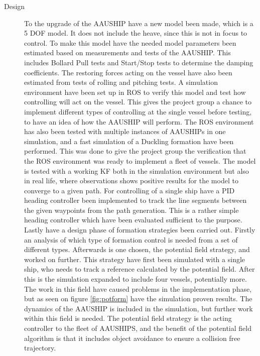 \begin{description}
\item[Design] To the upgrade of the AAUSHIP have a new model been made, which is a 5 \ac{DOF} model. It does not include the heave, since this is not in focus to control. To make this model have the needed model parameters been estimated based on measurements and tests of the AAUSHIP. This includes Bollard Pull tests and Start/Stop tests to determine the damping coefficients. The restoring forces acting on the vessel have also been estimated from tests of rolling and pitching tests. A simulation environment have been set up in \ac{ROS} to verify this model and test how controlling will act on the vessel. This gives the project group a chance to implement different types of controlling at the single vessel before testing, to have an idea of how the AAUSHIP will perform. The \ac{ROS} environment has also been tested with multiple instances of AAUSHIPs in one simulation, and a fast simulation of a Duckling formation have been performed. This was done to give the project group the verification that the \ac{ROS} environment was ready to implement a fleet of vessels. The model is tested with a working \ac{KF} both in the simulation environment but also in real life, where observations shows positive results for the model to converge to a given path. For controlling of a single ship have a PID heading controller been implemented to track the line segments between the given waypoints from the path generation. This is a rather simple heading controller which have been evaluated sufficient to the purpose. Lastly have a design phase of formation strategies been carried out. Firstly an analysis of which type of formation control is needed from a set of different types. Afterwards is one chosen, the potential field strategy, and worked on further. This strategy have first been simulated with a single ship, who needs to track a reference calculated by the potential field. After this is the simulation expanded to include four vessels, potentially more. The work in this field have caused problems in the implementation phase, but as seen on figure \ref{fig:potform} have the simulation proven results. The dynamics of the AAUSHIP is included in the simulation, but further work within this field is needed. The potential field strategy is the acting controller to the fleet of AAUSHIPS, and the benefit of the potential field algorithm is that it includes object avoidance to ensure a collision free trajectory.
\end{description}

